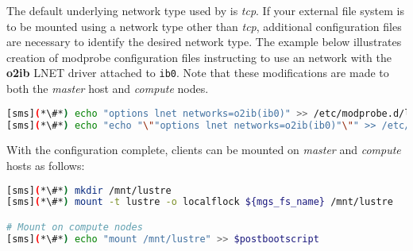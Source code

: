 

The default underlying network type used by \Lustre{} is {\em tcp}. If your
external \Lustre{} file system is to be mounted using a network type other than
{\em tcp}, additional configuration files are necessary to identify the desired
network type. The example below illustrates creation of modprobe configuration files
instructing \Lustre{} to use an \InfiniBand{} network with the \textbf{o2ib} LNET driver
attached to \texttt{ib0}. Note that these modifications are made to both the
{\em master} host and {\em compute} nodes.

\begin{lstlisting}[language=bash,keywords={},upquote=true]
[sms](*\#*) echo "options lnet networks=o2ib(ib0)" >> /etc/modprobe.d/lustre.conf
[sms](*\#*) echo "echo "\""options lnet networks=o2ib(ib0)"\"" >> /etc/modprobe.d/lustre.conf" >> $postbootscript
\end{lstlisting}

With the \Lustre{} configuration complete, clients can be mounted on {\em master}
and {\em compute} hosts as follows:
\begin{lstlisting}[language=bash,keywords={},upquote=true]
[sms](*\#*) mkdir /mnt/lustre
[sms](*\#*) mount -t lustre -o localflock ${mgs_fs_name} /mnt/lustre

# Mount on compute nodes
[sms](*\#*) echo "mount /mnt/lustre" >> $postbootscript
\end{lstlisting}
